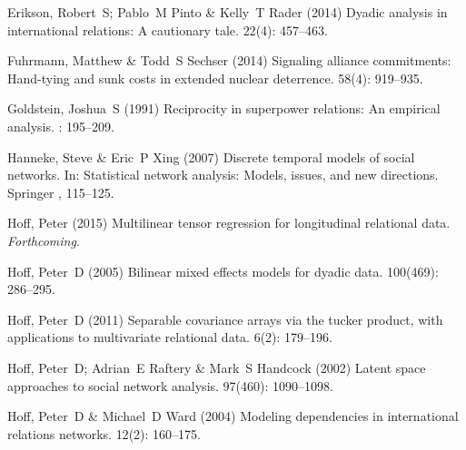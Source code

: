 \documentclass[3p,times,twocolumn,authoryear,12pt]{elsarticle}
\begin{document}
\begin{thebibliography}{}
Erikson, Robert~S; Pablo~M Pinto  \& Kelly~T Rader (2014) Dyadic analysis in
  international relations: A cautionary tale.
 { 22\/}(4): 457--463.

Fuhrmann, Matthew  \& Todd~S Sechser (2014) Signaling alliance commitments:
  Hand-tying and sunk costs in extended nuclear deterrence.
 { 58\/}(4): 919--935.

Goldstein, Joshua~S (1991) Reciprocity in superpower relations: An empirical
  analysis.
: 195--209.

Hanneke, Steve  \& Eric~P Xing (2007) Discrete temporal models of social
  networks.
\newblock In: Statistical network analysis: Models, issues, and new directions.
  Springer  ,  115--125.

Hoff, Peter (2015) Multilinear tensor regression for longitudinal relational
  data.
 {\em Forthcoming}.

Hoff, Peter~D (2005) Bilinear mixed effects models for dyadic data.
 { 100\/}(469):
  286--295.

Hoff, Peter~D (2011) Separable covariance arrays via the tucker product, with
  applications to multivariate relational data.
 { 6\/}(2): 179--196.

Hoff, Peter~D; Adrian~E Raftery  \& Mark~S Handcock (2002) Latent space
  approaches to social network analysis.
 { 97\/}(460):
  1090--1098.

Hoff, Peter~D  \& Michael~D Ward (2004) Modeling dependencies in international
  relations networks.
 { 12\/}(2): 160--175.


\end{thebibliography}
\end{document}
